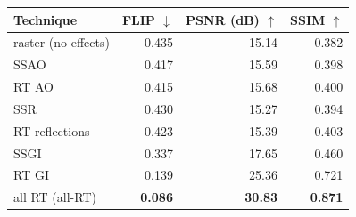 \begin{tabular}{lrrr}
\toprule
Technique & FLIP $\downarrow$ & PSNR (dB) $\uparrow$ & SSIM $\uparrow$ \\
\midrule
raster (no effects)  & 0.435 & 15.14 & 0.382 \\
SSAO                 & 0.417 & 15.59 & 0.398 \\
RT AO                & 0.415 & 15.68 & 0.400 \\
SSR                  & 0.430 & 15.27 & 0.394 \\
RT reflections       & 0.423 & 15.39 & 0.403 \\
SSGI                 & 0.337 & 17.65 & 0.460 \\
RT GI                & 0.139 & 25.36 & 0.721 \\
all RT (all-RT)      & \textbf{0.086} & \textbf{30.83} & \textbf{0.871} \\
\bottomrule
\end{tabular}

